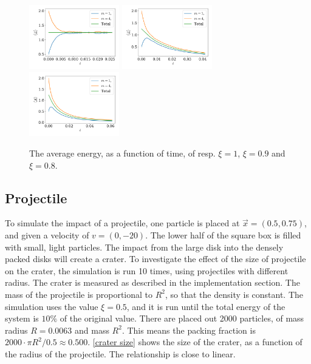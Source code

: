 \documentclass{article}
\begin{document}
    \begin{figure}[H]
        \centering
        \hspace{-5mm}
        \includegraphics[width=0.35\textwidth]{../plots/problem3/xi_0/energy_ex3.pdf}
        \hspace{-4mm}
        \includegraphics[width=0.35\textwidth]{../plots/problem3/xi_1/energy_ex3.pdf}
        \hspace{-4mm}
        \includegraphics[width=0.35\textwidth]{../plots/problem3/xi_2/energy_ex3.pdf}
        \hspace{-5mm}
        \caption{The average energy, as a function of time, of resp.
        $\xi=1$, $\xi=0.9$ and $\xi=0.8$.}
        \label{problem2 av en}
    \end{figure}

    \subsection*{Projectile}
    To simulate the impact of a projectile, one particle is placed at $\vec x = (0.5, 0.75)$, and given a velocity of $v = (0, -20)$.
    The lower half of the square box is filled with small, light particles.
    The impact from the large disk into the densely packed disks will create a crater.
    To investigate the effect of the size of projectile on the crater, the simulation is run 10 times, using projectiles with different radius.
    The crater is measured as described in the implementation section.
    The mass of the projectile is proportional to $R^2$, so that the density is constant.
    The simulation uses the value $\xi = 0.5$, and it is run until the total energy of the system is $10\%$ of the original value.
    There are placed out 2000 particles, of mass radius $R=0.0063$ and mass $R^2$.
    This means the packing fraction is $2000 \cdot \pi R^2 / 0.5 \approx 0.500$.
    \autoref{crater size} shows the size of the crater, as a function of the radius of the projectile.
    The relationship is close to linear.
\end{document}
